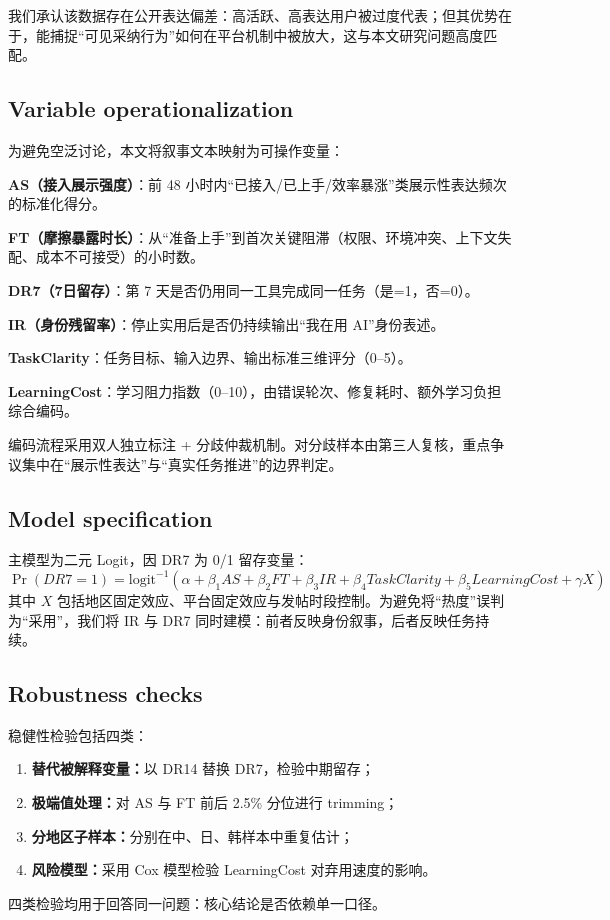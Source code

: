 \documentclass[11pt,a4paper]{ctexart}
\begin{document}
我们承认该数据存在公开表达偏差：高活跃、高表达用户被过度代表；但其优势在于，能捕捉“可见采纳行为”如何在平台机制中被放大，这与本文研究问题高度匹配。

\subsection{Variable operationalization}
为避免空泛讨论，本文将叙事文本映射为可操作变量：

\textbf{AS（接入展示强度）}：前 48 小时内“已接入/已上手/效率暴涨”类展示性表达频次的标准化得分。

\textbf{FT（摩擦暴露时长）}：从“准备上手”到首次关键阻滞（权限、环境冲突、上下文失配、成本不可接受）的小时数。

\textbf{DR7（7日留存）}：第 7 天是否仍用同一工具完成同一任务（是=1，否=0）。

\textbf{IR（身份残留率）}：停止实用后是否仍持续输出“我在用 AI”身份表述。

\textbf{TaskClarity}：任务目标、输入边界、输出标准三维评分（0--5）。

\textbf{LearningCost}：学习阻力指数（0--10），由错误轮次、修复耗时、额外学习负担综合编码。

编码流程采用双人独立标注 + 分歧仲裁机制。对分歧样本由第三人复核，重点争议集中在“展示性表达”与“真实任务推进”的边界判定。

\subsection{Model specification}
主模型为二元 Logit，因 DR7 为 0/1 留存变量：
\begin{equation}
\Pr(DR7=1)=\text{logit}^{-1}(\alpha+\beta_1 AS+\beta_2 FT+\beta_3 IR+\beta_4 TaskClarity+\beta_5 LearningCost+\gamma X)
\end{equation}
其中 $X$ 包括地区固定效应、平台固定效应与发帖时段控制。为避免将“热度”误判为“采用”，我们将 IR 与 DR7 同时建模：前者反映身份叙事，后者反映任务持续。

\subsection{Robustness checks}
稳健性检验包括四类：
\begin{enumerate}[leftmargin=1.2em]
\item \textbf{替代被解释变量：}以 DR14 替换 DR7，检验中期留存；
\item \textbf{极端值处理：}对 AS 与 FT 前后 2.5\% 分位进行 trimming；
\item \textbf{分地区子样本：}分别在中、日、韩样本中重复估计；
\item \textbf{风险模型：}采用 Cox 模型检验 LearningCost 对弃用速度的影响。
\end{enumerate}
四类检验均用于回答同一问题：核心结论是否依赖单一口径。
\end{document}
